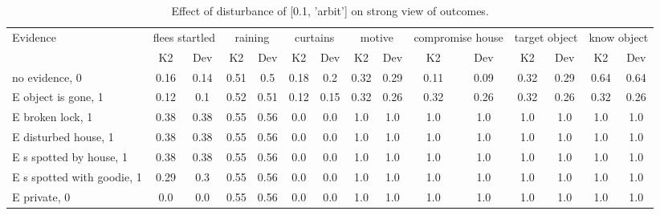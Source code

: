 \begin{table}\begin{tabular}{l|cc|cc|cc|cc|cc|cc|cc}\toprule\multirow{2}{*}{Evidence} & \multicolumn{2}{c}{flees startled}& \multicolumn{2}{c}{raining}& \multicolumn{2}{c}{curtains}& \multicolumn{2}{c}{motive}& \multicolumn{2}{c}{compromise house}& \multicolumn{2}{c}{target object}& \multicolumn{2}{c}{know object}\\& {K2} & {Dev}& {K2} & {Dev}& {K2} & {Dev}& {K2} & {Dev}& {K2} & {Dev}& {K2} & {Dev}& {K2} & {Dev}\\\midrule
no evidence, 0 & 0.16&0.14&0.51&0.5&0.18&0.2&0.32&0.29&0.11&0.09&0.32&0.29&0.64&0.64\\E object is gone, 1 & 0.12&0.1&0.52&0.51&0.12&0.15&\cellcolor{Bittersweet}0.32&\cellcolor{Bittersweet}0.26&\cellcolor{Bittersweet}0.32&\cellcolor{Bittersweet}0.26&\cellcolor{Bittersweet}0.32&\cellcolor{Bittersweet}0.26&\cellcolor{Bittersweet}0.32&\cellcolor{Bittersweet}0.26\\E broken lock, 1 & 0.38&0.38&0.55&0.56&0.0&0.0&1.0&1.0&1.0&1.0&1.0&1.0&1.0&1.0\\E disturbed house, 1 & 0.38&0.38&0.55&0.56&0.0&0.0&1.0&1.0&1.0&1.0&1.0&1.0&1.0&1.0\\E s spotted by house, 1 & 0.38&0.38&0.55&0.56&0.0&0.0&1.0&1.0&1.0&1.0&1.0&1.0&1.0&1.0\\E s spotted with goodie, 1 & 0.29&0.3&0.55&0.56&0.0&0.0&1.0&1.0&1.0&1.0&1.0&1.0&1.0&1.0\\E private, 0 & 0.0&0.0&0.55&0.56&0.0&0.0&1.0&1.0&1.0&1.0&1.0&1.0&1.0&1.0\\\bottomrule\end{tabular}\caption{Effect of disturbance of [0.1, 'arbit'] on strong view of outcomes.}\end{table}